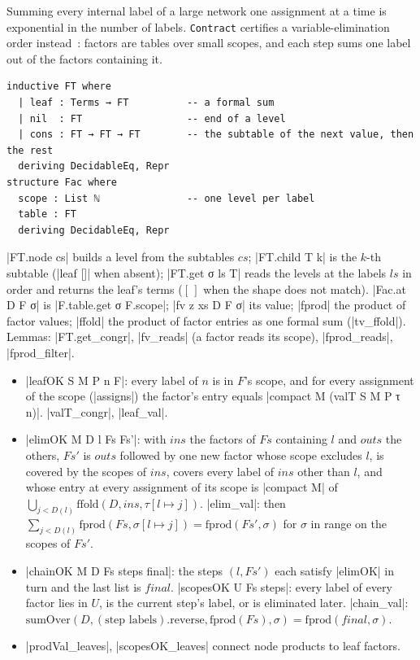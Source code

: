 Summing every internal label of a large network one assignment at a time is exponential in the number
of labels. \texttt{Contract} certifies a variable-elimination order
instead~\cite{dechter1999bucket}: factors are tables over small scopes, and each step sums one
label out of the factors containing it.
\begin{definition}
\begin{lstlisting}[style=leancore]
inductive FT where
  | leaf : Terms → FT          -- a formal sum
  | nil  : FT                  -- end of a level
  | cons : FT → FT → FT        -- the subtable of the next value, then the rest
  deriving DecidableEq, Repr
structure Fac where
  scope : List ℕ               -- one level per label
  table : FT
  deriving DecidableEq, Repr
\end{lstlisting}
\lean|FT.node cs| builds a level from the subtables $cs$; \lean|FT.child T k| is the $k$-th subtable
(\lean|leaf []| when absent); \lean|FT.get σ ls T| reads the levels at the labels $ls$ in order and
returns the leaf's terms ($[\,]$ when the shape does not match). \lean|Fac.at D F σ| is
\lean|F.table.get σ F.scope|; \lean|fv z xs D F σ| its value; \lean|fprod| the product of factor
values; \lean|ffold| the product of factor entries as one formal sum (\lean|tv_ffold|). Lemmas:
\lean|FT.get_congr|, \lean|fv_reads| (a factor reads its scope), \lean|fprod_reads|,
\lean|fprod_filter|.
\end{definition}

\begin{definition}[Checks]
\begin{itemize}
\item \lean|leafOK S M P n F|: every label of $n$ is in $F$'s scope, and for every assignment of the
  scope (\lean|assigns|) the factor's entry equals \leanLLone|compact M (valT S M P τ n)|.
  \lean|valT_congr|, \lean|leaf_val|.
\item \lean|elimOK M D l Fs Fs'|: with $ins$ the factors of $Fs$ containing $l$ and $outs$ the
  others, $Fs'$ is $outs$ followed by one new factor whose scope excludes $l$, is covered by the
  scopes of $ins$, covers every label of $ins$ other than $l$, and whose entry at every assignment
  of its scope is \lean|compact M| of $\bigcup_{j<D(l)}\mathrm{ffold}(D,ins,\tau[l\mapsto j])$.
  \lean|elim_val|: then $\sum_{j<D(l)}\mathrm{fprod}(Fs,\sigma[l\mapsto j])=\mathrm{fprod}(Fs',\sigma)$ for
  $\sigma$ in range on the scopes of $Fs'$.
\item \lean|chainOK M D Fs steps final|: the steps $(l,Fs')$ each satisfy \lean|elimOK| in turn and
  the last list is $final$. \lean|scopesOK U Fs steps|: every label of every factor lies in $U$, is
  the current step's label, or is eliminated later. \lean|chain_val|:
  $\mathrm{sumOver}(D,(\text{step labels}).\mathrm{reverse},\mathrm{fprod}(Fs),\sigma)=\mathrm{fprod}(final,\sigma)$.
\item \lean|prodVal_leaves|, \lean|scopesOK_leaves| connect node products to leaf factors.
\end{itemize}
\end{definition}

